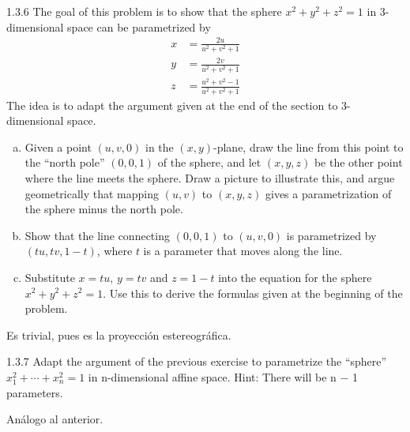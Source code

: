 \documentclass[twoside]{article}
\begin{document}
\newpage
\begin{ejercicio}{1.3.6}
The goal of this problem is to show that the sphere $x^2 + y^2 + z^2 = 1$ in $3$-dimensional space can be parametrized by
\begin{align*}
x&=\frac{2u}{u^2+v^2+1}\\
y&=\frac{2v}{u^2+v^2+1}\\
z&=\frac{u^2+v^2-1}{u^2+v^2+1}
\end{align*}
The idea is to adapt the argument given at the end of the section to 3-dimensional space.
\begin{enumerate}[a)]
\item Given a point $(u, v, 0)$ in the $(x, y)$-plane, draw the line from this point to the “north pole” $(0, 0, 1)$ of the sphere, and let $(x, y, z)$ be the other point where the line meets the sphere. Draw a picture to illustrate this, and argue geometrically that mapping
$(u, v)$ to $(x, y, z)$ gives a parametrization of the sphere minus the north pole.
\item Show that the line connecting $(0, 0, 1)$ to $(u, v, 0)$ is parametrized by $(tu, tv, 1 − t)$,
where $t$ is a parameter that moves along the line.
\item Substitute $x = tu$, $y = tv$ and $z = 1−t$ into the equation for the sphere $x^2+y^2+z^2 = 1$.
Use this to derive the formulas given at the beginning of the problem.
\end{enumerate}
\end{ejercicio}
\begin{solucion}
Es trivial, pues es la proyección estereográfica.
\end{solucion}

\newpage

\begin{ejercicio}{1.3.7} Adapt the argument of the previous exercise to parametrize the “sphere” $x^2_1
+\cdots+x^{2}_n = 1$ in n-dimensional affine space. Hint: There will be n − 1 parameters.
\end{ejercicio}
\begin{solucion}
Análogo al anterior.
\end{solucion}

\newpage
\end{document}
